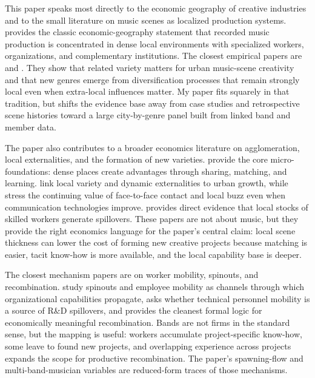 This paper speaks most directly to the economic geography of creative industries and to the small
literature on music scenes as localized production systems. \citet{scott_1999} provides the
classic economic-geography statement that recorded music production is concentrated in dense local
environments with specialized workers, organizations, and complementary institutions. The closest
empirical papers are \citet{klement_strambach_eg_2019} and
\citet{klement_strambach_rs_2019}. They show that related variety matters for urban music-scene
creativity and that new genres emerge from diversification processes that remain strongly local
even when extra-local influences matter. My paper fits squarely in that tradition, but shifts the
evidence base away from case studies and retrospective scene histories toward a large
city-by-genre panel built from linked band and member data.

The paper also contributes to a broader economics literature on agglomeration, local externalities,
and the formation of new varieties. \citet{duranton_puga_2004} provide the core micro-foundations:
dense places create advantages through sharing, matching, and learning. \citet{glaeser_etal_1992}
link local variety and dynamic externalities to urban growth, while \citet{storper_venables_2004}
stress the continuing value of face-to-face contact and local buzz even when communication
technologies improve. \citet{moretti_2004} provides direct evidence that local stocks of skilled
workers generate spillovers. These papers are not about music, but they provide the right
economics language for the paper's central claim: local scene thickness can lower the cost of
forming new creative projects because matching is easier, tacit know-how is more available, and
the local capability base is deeper.

The closest mechanism papers are on worker mobility, spinouts, and recombination.
\citet{franco_filson_2006} study spinouts and employee mobility as channels through which
organizational capabilities propagate, \citet{moen_2000} asks whether technical personnel mobility
is a source of R\&D spillovers, and \citet{weitzman_1998} provides the cleanest formal logic for
economically meaningful recombination. Bands are not firms in the standard sense, but the mapping
is useful: workers accumulate project-specific know-how, some leave to found new projects, and
overlapping experience across projects expands the scope for productive recombination. The paper's
spawning-flow and multi-band-musician variables are reduced-form traces of those mechanisms.


